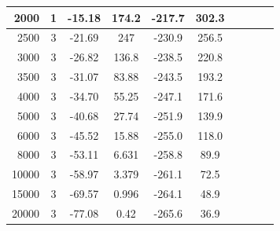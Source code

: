\documentclass[10pt,a4paper]{article}
\begin{document}
\begin{longtable}{|r|c|c|c|c|c|p{2.4cm}|p{2.4cm}|p{2.4cm}|p{3.6cm}|}
2000 & 1 & -15.18 & 174.2 & -217.7 & 302.3 & & & & \\ \hline
2500 & 3 & -21.69 & 247 & -230.9 & 256.5 & & & & \\ \hline
3000 & 3 & -26.82 & 136.8 & -238.5 & 220.8 & & & & \\ \hline
3500 & 3 & -31.07 & 83.88 & -243.5 & 193.2 & & & & \\ \hline
4000 & 3 & -34.70 & 55.25 & -247.1 & 171.6 & & & & \\ \hline
5000 & 3 & -40.68 & 27.74 & -251.9 & 139.9 & & & & \\ \hline
6000 & 3 & -45.52 & 15.88 & -255.0 & 118.0 & & & & \\ \hline
8000 & 3 & -53.11 & 6.631 & -258.8 & 89.9 & & & & \\ \hline
10000 & 3 & -58.97 & 3.379 & -261.1 & 72.5 & & & & \\ \hline
15000 & 3 & -69.57 & 0.996 & -264.1 & 48.9 & & & & \\ \hline
20000 & 3 & -77.08 & 0.42 & -265.6 & 36.9 & & & & \\ \hline
\end{longtable}
\end{document}
